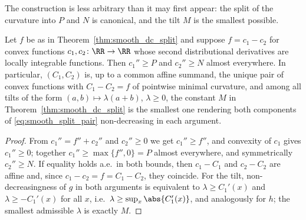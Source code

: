 The construction is less arbitrary than it may first appear: the split of the curvature into $P$ and $N$ is canonical, and the tilt $M$ is the smallest possible.

\begin{proposition}\label{prop:curvature_minimality}
Let $f$ be as in Theorem~\ref{thm:smooth_dc_split} and suppose $f = c_1 - c_2$ for convex functions $c_1, c_2 \colon \RR \to \RR$ whose second distributional derivatives are locally integrable functions. Then $c_1'' \ge P$ and $c_2'' \ge N$ almost everywhere. In particular, $(C_1, C_2)$ is, up to a common affine summand, the unique pair of convex functions with $C_1 - C_2 = f$ of pointwise minimal curvature, and among all tilts of the form $(a,b) \mapsto \lambda(a+b)$, $\lambda \ge 0$, the constant $M$ in Theorem~\ref{thm:smooth_dc_split} is the smallest one rendering both components of \eqref{eq:smooth_split_pair} non-decreasing in each argument.
\hfill{}
\end{proposition}

\begin{proof}
From $c_1'' = f'' + c_2''$ and $c_2'' \ge 0$ we get $c_1'' \ge f''$, and convexity of $c_1$ gives $c_1'' \ge 0$; together $c_1'' \ge \max\{f'', 0\} = P$ almost everywhere, and symmetrically $c_2'' \ge N$. If equality holds a.e.\ in both bounds, then $c_1 - C_1$ and $c_2 - C_2$ are affine and, since $c_1 - c_2 = f = C_1 - C_2$, they coincide. For the tilt, non-decreasingness of $g$ in both arguments is equivalent to $\lambda \ge C_1'(x)$ and $\lambda \ge -C_1'(x)$ for all $x$, i.e.\ $\lambda \ge \sup_x \abs{C_1'(x)}$, and analogously for $h$; the smallest admissible $\lambda$ is exactly $M$.
\end{proof}


